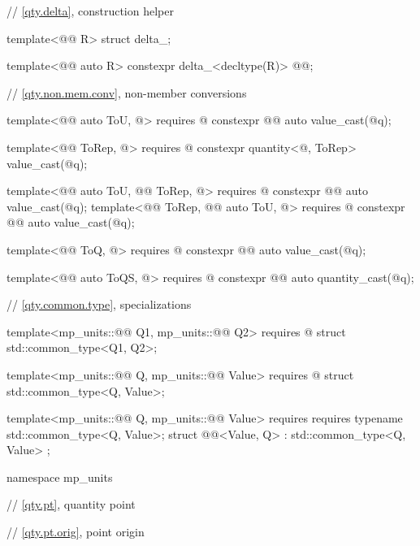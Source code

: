 \begin{codeblock}
{// \ref{qty.delta}, construction helper 

template<@@ R>
struct delta_;

template<@@ auto R>
constexpr delta_<decltype(R)> @@{};

// \ref{qty.non.mem.conv}, non-member conversions

template<@@ auto ToU, @\seebelownc@>
  requires @\seebelownc@
constexpr @@ auto value_cast(@\seebelownc@ q);

template<@@ ToRep, @\seebelownc@>
  requires @\seebelownc@
constexpr quantity<@\seebelownc@, ToRep> value_cast(@\seebelownc@ q);

template<@@ auto ToU, @@ ToRep, @\seebelownc@>
  requires @\seebelownc@
constexpr @@ auto value_cast(@\seebelownc@ q);
template<@@ ToRep, @@ auto ToU, @\seebelownc@>
  requires @\seebelownc@
constexpr @@ auto value_cast(@\seebelownc@ q);

template<@@ ToQ, @\seebelownc@>
  requires @\seebelownc@
constexpr @@ auto value_cast(@\seebelownc@ q);

template<@@ auto ToQS, @\seebelownc@>
  requires @\seebelownc@
constexpr @@ auto quantity_cast(@\seebelownc@ q);

}

// \ref{qty.common.type},  specializations

template<mp_units::@@ Q1, mp_units::@@ Q2>
  requires @\seebelownc@
struct std::common_type<Q1, Q2>;

template<mp_units::@@ Q, mp_units::@@ Value>
  requires @\seebelownc@
struct std::common_type<Q, Value>;

template<mp_units::@@ Q, mp_units::@@ Value>
  requires requires { typename std::common_type<Q, Value>; }
struct @@<Value, Q> : std::common_type<Q, Value> {};

namespace mp_units {

// \ref{qty.pt}, quantity point

// \ref{qty.pt.orig}, point origin

}
\end{codeblock}
